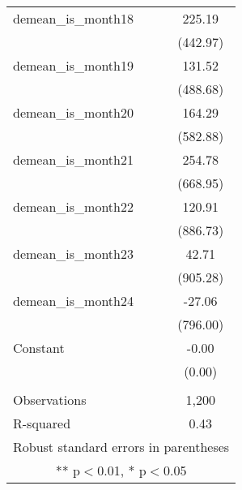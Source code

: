 \begin{tabular}{lc}
demean\_is\_month18 & 225.19 \\
 & (442.97) \\
demean\_is\_month19 & 131.52 \\
 & (488.68) \\
demean\_is\_month20 & 164.29 \\
 & (582.88) \\
demean\_is\_month21 & 254.78 \\
 & (668.95) \\
demean\_is\_month22 & 120.91 \\
 & (886.73) \\
demean\_is\_month23 & 42.71 \\
 & (905.28) \\
demean\_is\_month24 & -27.06 \\
 & (796.00) \\
Constant & -0.00 \\
 & (0.00) \\
 &  \\
Observations & 1,200 \\
 R-squared & 0.43 \\ \hline
\multicolumn{2}{c}{ Robust standard errors in parentheses} \\
\multicolumn{2}{c}{ ** p$<$0.01, * p$<$0.05} \\
\end{tabular}
